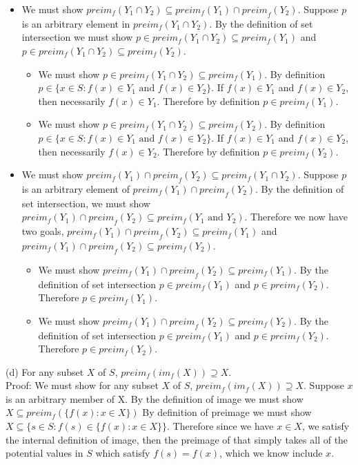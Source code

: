 \documentclass[12pt, letterpaper]{article}
\begin{document}
	\begin{itemize}
		\item We must show $preim_f(Y_1 \cap Y_2) \subseteq preim_f (Y_1) \cap {preim}_f(Y_2)$.  Suppose $p$ is an arbitrary element in $preim_f(Y_1 \cap Y_2)$.  By the definition of set intersection we must show $p \in preim_f(Y_1 \cap Y_2) \subseteq preim_f (Y_1)$ and $p \in preim_f(Y_1 \cap Y_2) \subseteq preim_f (Y_2)$.
		\begin{itemize}
			\item We must show $p \in preim_f(Y_1 \cap Y_2) \subseteq preim_f (Y_1)$.  By definition $p \in \{x \in S: f(x) \in Y_1 \text{ and } f(x) \in Y_2\}$.  If $f(x) \in Y_1$ and $f(x) \in Y_2$, then necessarily $f(x) \in Y_1.$  Therefore by definition $p \in preim_f(Y_1).$  
			\item We must show $p \in preim_f(Y_1 \cap Y_2) \subseteq preim_f (Y_2)$.  By definition $p \in \{x \in S: f(x) \in Y_1 \text{ and } f(x) \in Y_2\}$.  If $f(x) \in Y_1$ and $f(x) \in Y_2$, then necessarily $f(x) \in Y_2.$  Therefore by definition $p \in preim_f(Y_2).$  
		\end{itemize}
		\item We must show $preim_f (Y_1) \cap {preim}_f(Y_2) \subseteq preim_f(Y_1 \cap Y_2)$.  Suppose $p$ is an arbitrary element of $preim_f (Y_1) \cap {preim}_f(Y_2)$.  By the definition of set intersection, we must show $preim_f (Y_1) \cap {preim}_f(Y_2) \subseteq preim_f(Y_1 \text{ and } Y_2)$.  Therefore we now have two goals, $preim_f (Y_1) \cap {preim}_f(Y_2) \subseteq preim_f(Y_1)$ and $preim_f (Y_1) \cap {preim}_f(Y_2) \subseteq preim_f(Y_2)$.
		\begin{itemize}
			\item We must show $preim_f (Y_1) \cap {preim}_f(Y_2) \subseteq preim_f(Y_1)$.  By the definition of set intersection $p \in preim_f (Y_1)$ and $p \in preim_f (Y_2).$  Therefore $p \in preim_f (Y_1).$
			\item We must show $preim_f (Y_1) \cap {preim}_f(Y_2) \subseteq preim_f(Y_2)$.  By the definition of set intersection $p \in preim_f (Y_1)$ and $p \in preim_f (Y_2).$  Therefore $p \in preim_f (Y_2).$
		\end{itemize}
	\end{itemize}

(d) For any subset $X$ of $S$, $preim_f(im_f(X)) \supseteq X$.\\
Proof: We must show for any subset $X$ of $S$, $preim_f(im_f(X)) \supseteq X$.  Suppose $x$ is an arbitrary member of X.  By the definition of image we must show $X \subseteq preim_f(\{f(x): x\in X\})$  By definition of preimage we must show $X \subseteq \{s \in S: f(s) \in \{f(x): x \in X \} \}$.  Therefore since we have $x \in X$, we satisfy the internal definition of image, then the preimage of that simply takes all of the potential values in $S$ which satisfy $f(s) = f(x)$, which we know include $x$.\\
\end{document}
